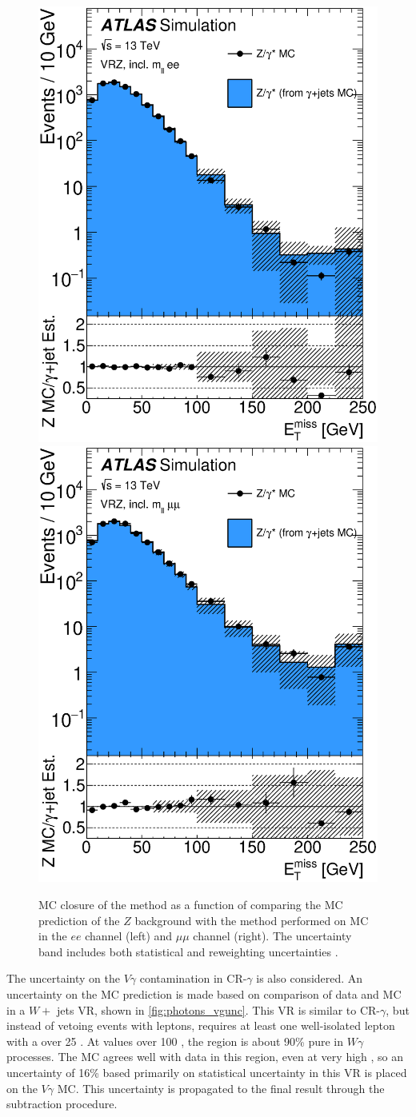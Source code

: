 \begin{centering}
\begin{figure}[!hbt]
\myfloatalign
\includegraphics[width=.48\linewidth]{figures/photons/Closure_plot_ee_zmet.eps}
\includegraphics[width=.48\linewidth]{figures/photons/Closure_plot_mm_zmet.eps}
\caption{\ac{MC} closure of the \gjets method as a function of \met comparing the \ac{MC} prediction of the $Z$ background with the \gjets method performed on \gjets \ac{MC} in the $ee$ channel (left) and $\mu\mu$ channel (right). The uncertainty band includes both statistical and reweighting uncertainties \cite{this_paper}.}
\label{fig:photons_mcclos}
\end{figure}
\end{centering}

The uncertainty on the $V\gamma$ contamination in CR-$\gamma$ is also considered. An uncertainty on the \ac{MC} prediction is made based on comparison of data and \ac{MC} in a $W +$ jets \ac{VR}, shown in \autoref{fig:photons_vgunc}. This \ac{VR} is similar to CR-$\gamma$, but instead of vetoing events with leptons, requires at least one well-isolated lepton with a \pt over 25 \gev. At \met values over 100 \gev, the region is about 90\% pure in $W\gamma$ processes. The \ac{MC} agrees well with data in this region, even at very high \met, so an uncertainty of 16\% based primarily on statistical uncertainty in this \ac{VR} is placed on the $V\gamma$ \ac{MC}. This uncertainty is propagated to the final result through the subtraction procedure.

